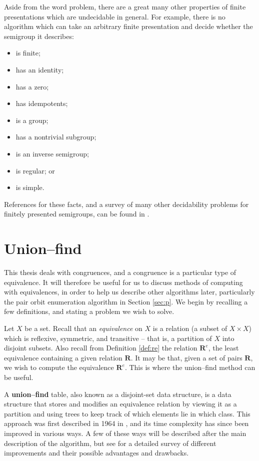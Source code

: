 Aside from the word problem, there are a great many other properties of finite
presentations which are undecidable in general.  For example, there is no
algorithm which can take an arbitrary finite presentation and decide whether the
semigroup it describes:
\begin{itemize}
\item is finite;
\item has an identity;
\item has a zero;
\item has idempotents;
\item is a group;
\item has a nontrivial subgroup;
\item is an inverse semigroup;
\item is regular; or
\item is simple.
\end{itemize}
References for these facts, and a survey of many other decidability problems for
finitely presented semigroups, can be found in \cite{cain_maltcev}.

\section{Union--find}
\label{sec:union-find}
This thesis deals with congruences, and a congruence is a particular type of
equivalence.  It will therefore be useful for us to discuss methods of computing
with equivalences, in order to help us describe other algorithms later,
particularly the pair orbit enumeration algorithm in Section \ref{sec:p}.  We
begin by recalling a few definitions, and stating a problem we wish to solve.

Let $X$ be a set.  Recall that an \textit{equivalence} on $X$ is a relation (a
subset of $X \times X$) which is reflexive, symmetric, and transitive -- that is,
a partition of $X$ into disjoint subsets.  Also recall from Definition
\ref{def:re} the relation $\mathbf{R}^e$, the least equivalence containing a
given relation $\mathbf{R}$.  It may be that, given a set of pairs $\mathbf{R}$,
we wish to compute the equivalence $\mathbf{R}^e$.  This is where the union--find
method can be useful.

A \textbf{union--find} table, also known as a disjoint-set data structure, is a
data structure that stores and modifies an equivalence relation by viewing it as
a partition and using trees to keep track of which elements lie in which class.
This approach was first described in 1964 in \cite{galler_1964}, and its time
complexity has since been improved in various ways.  A few of these ways will be
described after the main description of the algorithm, but see \cite{galil_1991}
for a detailed survey of different improvements and their possible advantages
and drawbacks.

